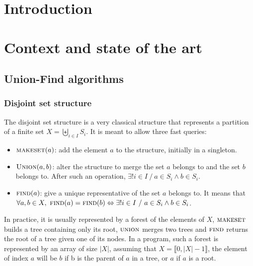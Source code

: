 \documentclass[12px]{article}
\begin{document}
  \section{Introduction}

  \section{Context and state of the art}
    \subsection{Union-Find algorithms}
      \subsubsection{Disjoint set structure}
        The disjoint set structure is a very classical structure that represents a partition of a finite set $X = \biguplus\limits_{i \in I} S_i$. It is meant to allow three fast queries:
        \begin{itemize}
          \item $\Call{makeset}{a}$: add the element $a$ to the structure, initially in a singleton.
          \item $\Call{Union}{a, b}$: alter the structure to merge the set $a$ belongs to and the set $b$ belongs to. After such an operation, $\exists! i \in I~/~a \in S_i \land b \in S_i$.
          \item $\Call{find}{a}$: give a unique representative of the set $a$ belongs to. It means that $\forall a, b \in X,~\Call{find}{a} = \Call{find}{b} \Leftrightarrow \exists! i \in I~/~a \in S_i \land b \in S_i$.
        \end{itemize}
        In practice, it is usually represented by a forest of the elements of $X$, $\textsc{makeset}$ builds a tree containing only its root, $\textsc{union}$ merges two trees and $\textsc{find}$ returns the root of a tree given one of its nodes.
        In a program, such a forest is represented by an array of size $|X|$, assuming that $X = \llbracket 0, |X|-1 \rrbracket$, the element of index $a$ will be $b$ if b is the parent of $a$ in a tree, or $a$ if $a$ is a root.
\end{document}
